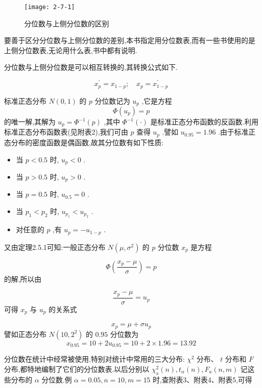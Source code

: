 \begin{figure}
	\centering
	\texttt{[image: 2-7-1]}
	\caption{分位数与上侧分位数的区别}
	\label{fig:2.7.1}
\end{figure}

要善于区分分位数与上侧分位数的差别,本书指定用分位数表,而有一些书使用的是上侧分位数表,无论用什么表,书中都有说明.

分位数与上侧分位数是可以相互转换的,其转换公式如下.

\begin{equation}
x_{p}^{\prime}=x_{1-p} ; \quad x_{p}=x_{1-p}^{\prime} \label{eq:2.7.6}
\end{equation}

\begin{example}\label{exam:2.7.3}
	标准正态分布 $ N(0,1) $ 的 $ p $ 分位数记为 $ u_{p} $ ,它是方程
	\[
	\Phi\left(u_{p}\right)=p
	\]
	的唯一解,其解为 $ u_{p}=\Phi^{-1}(p) $ ,其中 $ \Phi^{-1}(\cdot) $ 是标准正态分布函数的反函数.利用标准正态分布函数表(见附表2),我们可由 $ p $ 查得 $ u_{p} $ .譬如 $ u_{0.95}=1.96 $ .由于标准正态分布的密度函数是偶函数,故其分位数有如下性质:
	
	\begin{itemize}
		\item 当 $ p<0.5 $ 时, $ u_{p}<0 $ .
		\item 当 $ p>0.5 $ 时, $ u_{p}>0 $ .
		\item 当 $ p=0.5 $ 时, $ u_{0.5}=0 $ .
		\item 当 $ p_{1}<p_{2} $ 时, $ u_{p_{1}}<u_{p_{2}} $ .
		\item 对任意的 $ p $ ,有 $ u_{p}=-u_{1-p} $ .
	\end{itemize}
	
	又由定理2.5.1可知:一般正态分布 $ N\left(\mu, \sigma^{2}\right) $ 的 $ p $ 分位数 $ x_{p} $ 是方程
	
	\[
	\Phi\left(\frac{x_{p}-\mu}{\sigma}\right)=p
	\]
	的解,所以由
	
	\[
	\frac{x_{p}-\mu}{\sigma}=u_{p}
	\]
	可得 $ x_{p} $ 与 $ u_{p} $ 的关系式
	
	\begin{equation}
	x_{p}=\mu+\sigma u_{p} \label{eq:2.7.7}
	\end{equation}
	譬如正态分布 $ N\left(10,2^{2}\right) $ 的 $ 0.95 $ 分位数为
	\[
	x_{0.95}=10+2 u_{0.95}=10+2 \times 1.96=13.92
	\]
\end{example}

分位数在统计中经常被使用,特别对统计中常用的三大分布: $ \chi^{2} $ 分布、 $ t $ 分布和 $ F $ 分布,都特地编制了它们的分位数表.以后分别以 $ \chi_{\mathrm{a}}^{2}(n), t_{\alpha}(n) , F_{a}(n, m) $ 记这些分布的 $ \alpha $ 分位数.例 $ \alpha=0.05, n=10, m=15 $ 时,查附表3、附表4、附表5,可得

